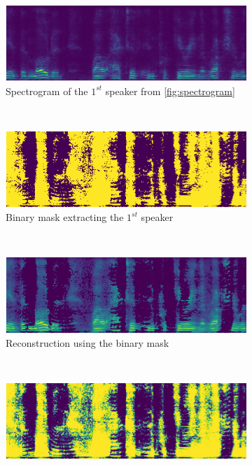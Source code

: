 \documentclass[master, tikz, final,11pt, dvipdfmx]{iscs-thesis}
\begin{document}
\begin{figure}[h]
\centering
\begin{subfigure}[b]{0.9\textwidth}
\includegraphics[width=\textwidth]{xnonmix1}
\caption{Spectrogram of the $1^{st}$ speaker from \ref{fig:spectrogram}}
\label{fig:nonmix1} 
\end{subfigure}
\\
\begin{subfigure}[b]{0.45\textwidth}
\includegraphics[width=\textwidth]{ibm1}
\caption{Binary mask extracting the  $1^{st}$ speaker}
\label{fig:ibm1} 
\end{subfigure}
~
\begin{subfigure}[b]{0.45\textwidth}
\includegraphics[width=\textwidth]{sepibm1}
\captionsetup{justification=centering}
\caption{Reconstruction using the binary mask}
\label{fig:ibmsep1} 
\end{subfigure}
\\
\begin{subfigure}[b]{0.45\textwidth}
\includegraphics[width=\textwidth]{wf1}

\end{subfigure}
\end{figure}
\end{document}
